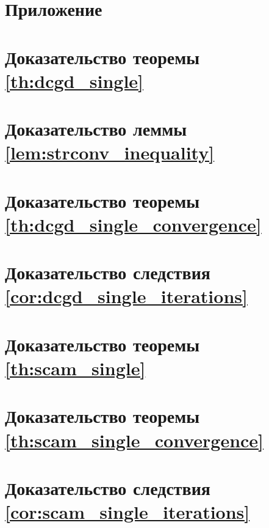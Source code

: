 \section*{Приложение}

\section{Доказательство теоремы \ref{th:dcgd_single}} \label{app:dcgd_single_proof}
\section{Доказательство леммы \ref{lem:strconv_inequality}} \label{app:strconv_inequality_proof}
\section{Доказательство теоремы \ref{th:dcgd_single_convergence}} \label{app:dcgd_single_convergence_proof}
\section{Доказательство следствия \ref{cor:dcgd_single_iterations}} \label{app:dcgd_single_iterations_proof}
\section{Доказательство теоремы \ref{th:scam_single}} \label{app:scam_single_proof}
\section{Доказательство теоремы \ref{th:scam_single_convergence}} \label{app:scam_single_convergence_proof}
\section{Доказательство следствия \ref{cor:scam_single_iterations}} \label{app:scam_single_iterations_proof}
